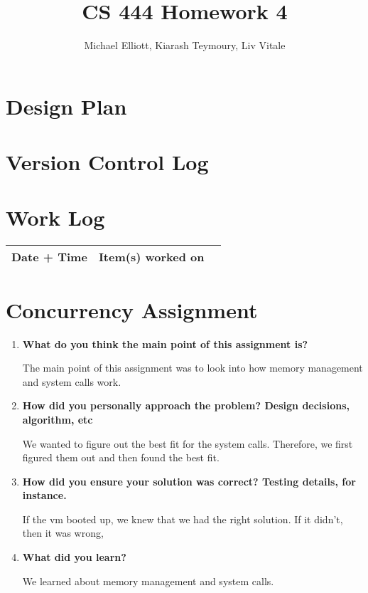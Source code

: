 \documentclass[letterpaper,10pt,titlepage,draftclsnofoot,onecolumn]{IEEEtran}
\title{CS 444 Homework 4}
\author{Michael Elliott, Kiarash Teymoury, Liv Vitale}
\begin{document}
\section{Design Plan}


\section{Version Control Log}


\section{Work Log}
\begin{tabular}{l | c | r}
Date + Time & Item(s) worked on \\
\hline

\end{tabular}

\section{Concurrency Assignment}
\begin{enumerate}
\item \textbf{What do you think the main point of this assignment is?}

\par The main point of this assignment was to look into how memory management and system calls work.

\item \textbf{How did you personally approach the problem? Design decisions, algorithm, etc}

\par We wanted to figure out the best fit for the system calls. Therefore, we first figured them out and then found the best fit.

\item \textbf{How did you ensure your solution was correct? Testing details, for instance.}

\par If the vm booted up, we knew that we had the right solution. If it didn't, then it was wrong,

\item \textbf{What did you learn?}

\par We learned about memory management and system calls.

\end{enumerate}

\nocite{*}



\end{document}
